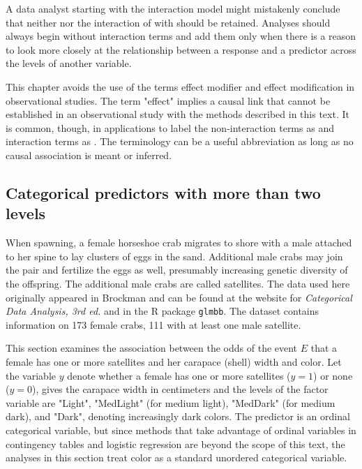 A data analyst starting with the interaction model might mistakenly conclude that neither  nor the interaction of  with  should be retained.  Analyses should always begin without interaction terms and add them only when there is a reason to look more closely at the relationship between a response and a predictor  across the levels of another variable.

This chapter avoids the use of the terms effect modifier and effect modification in observational studies. The term "effect" implies a causal link that cannot be established in an observational study with the methods described in this text.  It is common, though, in applications to label the non-interaction terms as  and interaction terms as .  The terminology can be a useful abbreviation as long as no causal association is meant or inferred.

\subsection{Categorical predictors with more than two levels}
\label{section:predictorsMoreThanTwoLevels}

When spawning, a female horseshoe crab migrates to shore with a male attached to her spine to lay clusters of eggs in the sand.  Additional male crabs may join the pair and fertilize the eggs as well, presumably increasing genetic diversity of the offspring. The additional male crabs are called satellites. The data used here originally appeared in Brockman  and can be found at the website for \textit{Categorical Data Analysis, 3rd ed.} and in the \textsf{R} package \texttt{glmbb}. The dataset contains information on 173 female crabs, 111 with at least one male satellite.

This section examines the association between the odds of the event $E$ that a female has one or more satellites and her carapace (shell) width and color.   Let the variable $y$ denote whether a female has one or more satellites ($y = 1$) or none ($y = 0$),  gives the carapace width in centimeters and the levels of the factor variable  are "Light", "MedLight" (for medium light), "MedDark" (for medium dark), and "Dark", denoting increasingly dark colors. The predictor  is an ordinal categorical variable, but since methods that take advantage of ordinal variables in contingency tables and logistic regression are beyond the scope of this text, the analyses in this section treat color as a standard unordered categorical variable.

